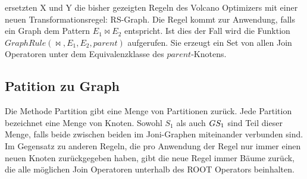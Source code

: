 ersetzten X und Y die bisher gezeigten Regeln des Volcano Optimizers mit einer neuen Transformationsregel: RS-Graph. Die Regel kommt zur Anwendung, falls ein Graph dem Pattern $E_1 \Join E_2$ entspricht. Ist dies der Fall wird die Funktion $GraphRule(\Join, E_1, E_2, parent)$ aufgerufen. Sie erzeugt ein Set von allen Join Operatoren unter dem Equivalenzklasse des $parent$-Knotens.




\subsubsection{}



\subsection{Patition zu Graph}



Die Methode Partition gibt eine Menge von Partitionen zurück. Jede Partition bezeichnet eine Menge von Knoten. Sowohl $S_1$ als auch $G\\S_1$ sind Teil dieser Menge, falls beide zwischen beiden im Joni-Graphen miteinander verbunden sind. Im Gegensatz zu anderen Regeln, die pro Anwendung der Regel nur immer einen neuen Knoten zurückgegeben haben, gibt die neue Regel immer Bäume zurück, die alle möglichen Join Operatoren unterhalb des ROOT Operators beinhalten.
